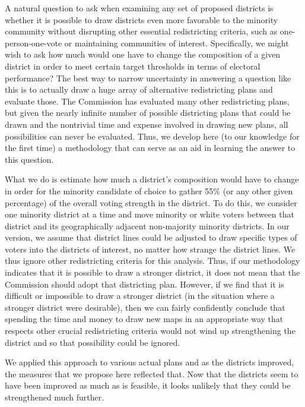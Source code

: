 \documentclass[12pt]{article}
\begin{document}
A natural question to ask when examining any set of proposed districts
is whether it is possible to draw districts even more favorable to the
minority community without disrupting other essential redistricting
criteria, such as one-person-one-vote or maintaining communities of
interest. Specifically, we might wish to ask how much would one have
to change the composition of a given district in order to meet certain
target thresholds in terms of electoral performance?  The best way to
narrow uncertainty in answering a question like this is to actually
draw a huge array of alternative redistricting plans and evaluate
those.  The Commission has evaluated many other redistricting plans,
but given the nearly infinite number of possible districting plans
that could be drawn and the nontrivial time and expense involved in
drawing new plans, all possibilities can never be evaluated.  Thus, we
develop here (to our knowledge for the first time) a methodology that
can serve as an aid in learning the answer to this question.

What we do is estimate how much a district's composition would have
to change in order for the minority candidate of choice to gather 55\%
(or any other given percentage) of the overall voting strength in the
district.  To do this, we consider one minority district at a time and
move minority or white voters between that district and its
geographically adjacent non-majority minority districts.  In our version, we assume that
district lines could be adjusted to draw specific types of voters into
the districts of interest, no matter how strange the district lines.
We thus ignore other redistricting criteria for this analysis.  Thus,
if our methodology indicates that it is possible to draw a stronger
district, it does not mean that the Commission should adopt that
districting plan.  However, if we find that it is difficult or
impossible to draw a stronger district (in the situation where a
stronger district were desirable), then we can fairly confidently
conclude that spending the time and money to draw new maps in an
appropriate way that respects other crucial redistricting criteria
would not wind up strengthening the district and so that possibility
could be ignored.

We applied this approach to various actual plans and as the districts
improved, the measures that we propose here reflected that.  Now that
the districts seem to have been improved as much as is feasible, it
looks unlikely that they could be strengthened much further.
\end{document}

